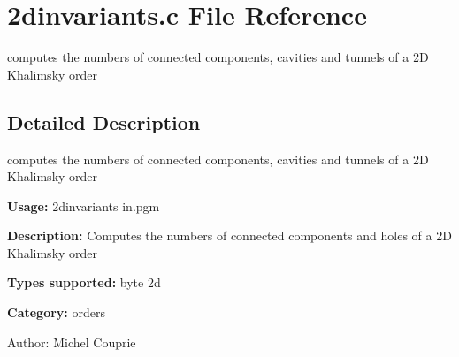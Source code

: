 \section{2dinvariants.c File Reference}
\label{2dinvariants_8c}
computes the numbers of connected components, cavities and tunnels of a 2D Khalimsky order  




\label{_details}
\subsection{Detailed Description}
computes the numbers of connected components, cavities and tunnels of a 2D Khalimsky order 

{\bf Usage:} 2dinvariants in.pgm

{\bf Description:} Computes the numbers of connected components and holes of a 2D Khalimsky order

{\bf Types supported:} byte 2d

{\bf Category:} orders

\begin{Desc}
\item[Author:]Michel Couprie \end{Desc}
